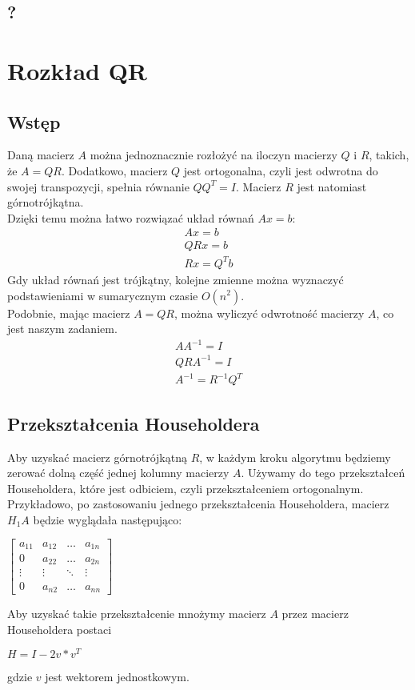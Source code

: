 \documentclass[11pt]{article}
\begin{document}
\subsection{?}

\section{Rozkład QR}
\subsection{Wstęp}
Daną macierz $A$ można jednoznacznie rozłożyć na iloczyn macierzy $Q$ i $R$, takich, że $A=QR$.
Dodatkowo, macierz $Q$ jest ortogonalna, czyli jest odwrotna do swojej transpozycji, spełnia równanie $QQ^T=I$.
Macierz $R$ jest natomiast górnotrójkątna. \\
Dzięki temu można łatwo rozwiązać układ równań $Ax=b$:
\begin{align*}
Ax=b \\
QRx=b \\
Rx = Q^Tb
\end{align*}
Gdy układ równań jest trójkątny, kolejne zmienne można wyznaczyć podstawieniami w sumarycznym czasie $O(n^2)$.\\

Podobnie, mając macierz $A=QR$, można wyliczyć odwrotność macierzy $A$, co jest naszym zadaniem.
\begin{align*}
AA^{-1}=I \\
QRA^{-1}=I \\
A^{-1}=R^{-1}Q^T
\end{align*}

\subsection{Przekształcenia Householdera}
Aby uzyskać macierz górnotrójkątną $R$, w każdym kroku algorytmu będziemy zerować
dolną część jednej kolumny macierzy $A$. Używamy do tego przekształceń Householdera,
które jest odbiciem, czyli przekształceniem ortogonalnym. 
Przykładowo, po zastosowaniu jednego przekształcenia Householdera,
macierz $H_1A$ będzie wyglądała następująco: 
\begin{center}
\begin{math}
\begin{bmatrix}
    a_{11} & a_{12} & \dots  & a_{1n} \\
    0 & a_{22} & \dots  & a_{2n} \\
    \vdots & \vdots & \ddots & \vdots \\
    0 & a_{n2} & \dots  & a_{nn}
\end{bmatrix}
\end{math}
\end{center}
Aby uzyskać takie przekształcenie mnożymy macierz $A$ przez macierz Householdera postaci 
\begin{center}
$H=I-2v*v^T$
\end{center}
gdzie $v$ jest wektorem jednostkowym.\\
\end{document}
